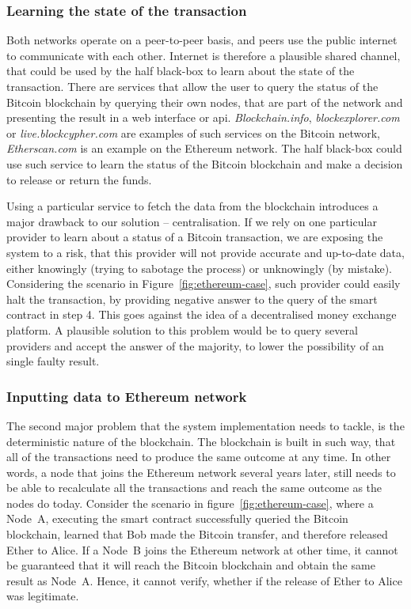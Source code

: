 \subsubsection{Learning the state of the transaction}
Both networks operate on a peer-to-peer basis, and peers use the public internet to communicate with each other. Internet is therefore a plausible shared channel, that could be used by the half black-box to learn about the state of the transaction. There are services that allow the user to query the status of the Bitcoin blockchain by querying their own nodes, that are part of the network and presenting the result in a web interface or \acrshort{api}. \textit{Blockchain.info}, \textit{blockexplorer.com} or \textit{live.blockcypher.com} are examples of such services on the Bitcoin network, \textit{Etherscan.com} is an example on the Ethereum network. The half black-box could use such service to learn the status of the Bitcoin blockchain and make a decision to release or return the funds.

Using a particular service to fetch the data from the blockchain introduces a major drawback to our solution -- centralisation. If we rely on one particular provider to learn about a status of a Bitcoin transaction, we are exposing the system to a risk, that this provider will not provide accurate and up-to-date data, either knowingly (trying to sabotage the process) or unknowingly (by mistake). Considering the scenario in Figure~\ref{fig:ethereum-case}, such provider could easily halt the transaction, by providing negative answer to the query of the smart contract in step 4. This goes against the idea of a decentralised money exchange platform. A plausible solution to this problem would be to query several providers and accept the answer of the majority, to lower the possibility of an single faulty result.

\subsubsection{Inputting data to Ethereum network}
The second major problem that the system implementation needs to tackle, is the deterministic nature of the blockchain. The blockchain is built in such way, that all of the transactions need to produce the same outcome at any time. In other words, a node that joins the Ethereum network several years later, still needs to be able to recalculate all the transactions and reach the same outcome as the nodes do today. Consider the scenario in figure~\ref{fig:ethereum-case}, where a Node~A, executing the smart contract successfully queried the Bitcoin blockchain, learned that Bob made the Bitcoin transfer, and therefore released Ether to Alice. If a Node~B joins the Ethereum network at other time, it cannot be guaranteed that it will reach the Bitcoin blockchain and obtain the same result as Node~A. Hence, it cannot verify, whether if the release of Ether to Alice was legitimate.

